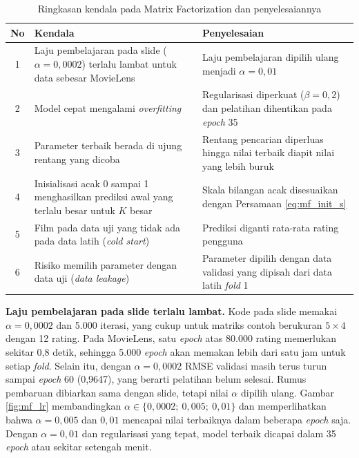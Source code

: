 \begin{table}[htbp]
\centering
\caption{Ringkasan kendala pada Matrix Factorization dan penyelesaiannya}
\label{tab:mf_kendala}
\small
\renewcommand{\arraystretch}{1.2}
\begin{tabularx}{\textwidth}{c >{\raggedright\arraybackslash}X >{\raggedright\arraybackslash}X}
\toprule
\textbf{No} & \textbf{Kendala} & \textbf{Penyelesaian} \\
\midrule
1 & Laju pembelajaran pada slide ($\alpha = 0{,}0002$) terlalu lambat untuk data sebesar MovieLens & Laju pembelajaran dipilih ulang menjadi $\alpha = 0{,}01$ \\
2 & Model cepat mengalami \textit{overfitting} & Regularisasi diperkuat ($\beta = 0{,}2$) dan pelatihan dihentikan pada \textit{epoch} 35 \\
3 & Parameter terbaik berada di ujung rentang yang dicoba & Rentang pencarian diperluas hingga nilai terbaik diapit nilai yang lebih buruk \\
4 & Inisialisasi acak 0 sampai 1 menghasilkan prediksi awal yang terlalu besar untuk $K$ besar & Skala bilangan acak disesuaikan dengan Persamaan \ref{eq:mf_init_s} \\
5 & Film pada data uji yang tidak ada pada data latih (\textit{cold start}) & Prediksi diganti rata-rata rating pengguna \\
6 & Risiko memilih parameter dengan data uji (\textit{data leakage}) & Parameter dipilih dengan data validasi yang dipisah dari data latih \textit{fold} 1 \\
\bottomrule
\end{tabularx}
\end{table}

\textbf{Laju pembelajaran pada slide terlalu lambat.} Kode pada slide memakai $\alpha = 0{,}0002$ dan 5.000 iterasi, yang cukup untuk matriks contoh berukuran $5 \times 4$ dengan 12 rating. Pada MovieLens, satu \textit{epoch} atas 80.000 rating memerlukan sekitar 0,8 detik, sehingga 5.000 \textit{epoch} akan memakan lebih dari satu jam untuk setiap \textit{fold}. Selain itu, dengan $\alpha = 0{,}0002$ RMSE validasi masih terus turun sampai \textit{epoch} 60 (0,9647), yang berarti pelatihan belum selesai. Rumus pembaruan dibiarkan sama dengan slide, tetapi nilai $\alpha$ dipilih ulang. Gambar \ref{fig:mf_lr} membandingkan $\alpha \in \{0{,}0002;\ 0{,}005;\ 0{,}01\}$ dan memperlihatkan bahwa $\alpha = 0{,}005$ dan $0{,}01$ mencapai nilai terbaiknya dalam beberapa \textit{epoch} saja. Dengan $\alpha = 0{,}01$ dan regularisasi yang tepat, model terbaik dicapai dalam 35 \textit{epoch} atau sekitar setengah menit.

